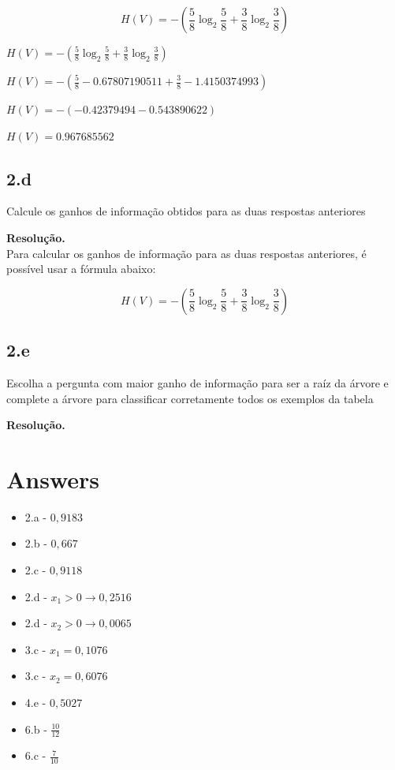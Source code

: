 \documentclass[12pt,letterpaper]{article}
\newcommand\answer{\textbf{Resolução.}\xspace}
\begin{document}
\[
	H(V) = - (\frac{5}{8}\log_2\frac{5}{8} + \frac{3}{8}\log_2\frac{3}{8})
\]

$H(V) = - (\frac{5}{8}\log_2\frac{5}{8} + \frac{3}{8}\log_2\frac{3}{8})$

$H(V) = - (\frac{5}{8}-0.67807190511 + \frac{3}{8}-1.4150374993)$

$H(V) = - (-0.42379494 -0.543890622)$

$H(V) = 0.967685562$

\subsection*{2.d}

Calcule os ganhos de informação obtidos para as duas respostas anteriores

\answer \\

Para calcular os ganhos de informação para as duas respostas anteriores, é possível usar a fórmula abaixo:

\[
	H(V) = - (\frac{5}{8}\log_2\frac{5}{8} + \frac{3}{8}\log_2\frac{3}{8})
\]



\subsection*{2.e}

Escolha a pergunta com maior ganho de informação para ser a raíz da árvore e complete a árvore para classificar corretamente todos os exemplos da tabela

\answer \\

\section*{Answers}

\begin{itemize}
	\item 2.a - $0,9183$
	\item 2.b - $0,667$
	\item 2.c - $0,9118$
	\item 2.d - $x_1 > 0 \rightarrow 0,2516$
	\item 2.d - $x_2 > 0 \rightarrow 0,0065$
	\item 3.c - $x_1 = 0,1076$
	\item 3.c - $x_2 = 0,6076$
	\item 4.e - $0,5027$
	\item 6.b - $\frac{10}{12}$
	\item 6.c - $\frac{7}{10}$
\end{itemize}
\end{document}
